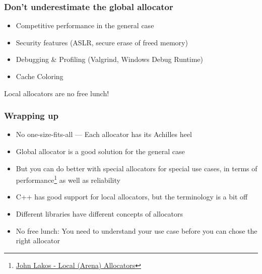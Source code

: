 \documentclass[aspectratio=169]{beamer}
\begin{document}
\begin{frame}
  \frametitle{Don't underestimate the global allocator}

  \begin{itemize}
  \item Competitive performance in the general case
  \item Security features (ASLR, secure erase of freed memory)
  \item Debugging \& Profiling (Valgrind, Windows Debug Runtime)
  \item Cache Coloring
  \end{itemize}

  Local allocators are no free lunch!
\end{frame}


\begin{frame}
  \frametitle{Wrapping up}

  \begin{itemize}
  \item No one-size-fits-all --- Each allocator has its Achilles heel
  \item Global allocator is a good solution for the general case
  \item But you can do better with special allocators for special use cases, in terms of performance\footnote{\href{https:://youtube.com/}{John Lakos - Local (Arena) Allocators}} as well as reliability
  \item C++ has good support for local allocators, but the terminology is a bit off
  \item Different libraries have different concepts of allocators
  \item No free lunch: You need to understand your use case before you can chose the right allocator
  \end{itemize}
\end{frame}

\end{document}
